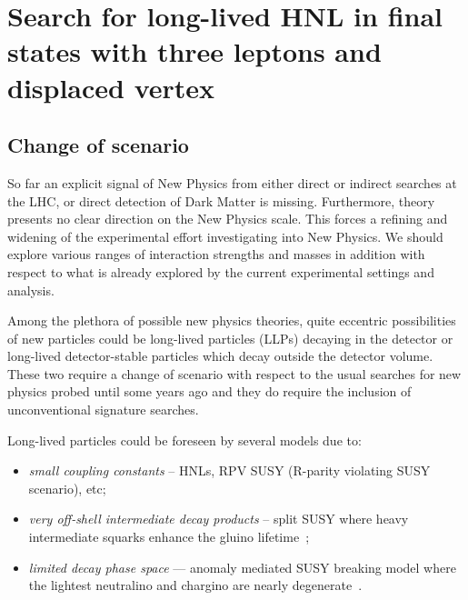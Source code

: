 \chapter{Search for long-lived HNL in final states
with three leptons and displaced vertex} \label{Chapter6} 

\section{Change of scenario}

So far an explicit signal of New Physics from either direct or indirect
searches at the LHC, or direct detection of Dark Matter is
missing. Furthermore, theory presents no clear direction on the New Physics scale.
This forces a refining and widening of the experimental effort
investigating into New Physics. We should explore various ranges of
interaction strengths and masses in addition with respect to
what is already explored by the current experimental
settings and analysis.

Among the plethora of possible new physics theories, quite eccentric
possibilities of new particles could be long-lived particles (LLPs)
decaying in the detector or long-lived detector-stable particles which decay outside the detector volume. 
These two require a change of scenario with respect to the usual
searches for new physics probed until some years ago and they do require the
inclusion of unconventional signature searches.

Long-lived particles could be foreseen by several models due to:
\begin{itemize}
\setlength\itemsep{-0.1em}
\item \emph{small coupling constants} -- \ie HNLs, RPV SUSY (R-parity violating
  SUSY scenario), etc;
\item \emph{very off-shell intermediate decay products} -- \ie split SUSY where
heavy intermediate squarks enhance
the gluino lifetime~\cite{ATLAS-CONF-2019-006,2020135114};
\item \emph{limited decay phase space} --- \ie
anomaly mediated SUSY breaking
model where the lightest neutralino
and chargino are nearly degenerate~\cite{Sirunyan:2019wau,Sirunyan:2019gut}.
\end{itemize}

